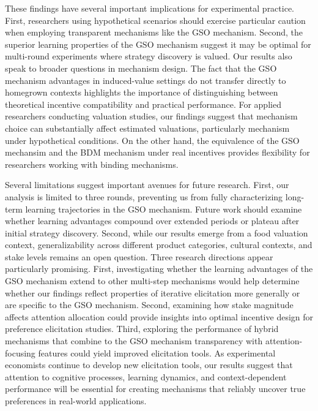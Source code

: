 \documentclass[12pt]{article}
\begin{document}
These findings have several important implications for experimental practice. First, researchers using hypothetical scenarios should exercise particular caution when employing transparent mechanisms like the GSO mechanism. Second, the superior learning properties of the GSO mechanism suggest it may be optimal for multi-round experiments where strategy discovery is valued. 
Our results also speak to broader questions in mechanism design. The fact that the GSO mechanism advantages in induced-value settings do not transfer directly to  homegrown contexts highlights the importance of distinguishing between theoretical incentive compatibility and practical performance. 
For applied researchers conducting valuation studies, our findings suggest that mechanism choice can substantially affect estimated valuations, particularly mechanism under hypothetical conditions. On the other hand, the equivalence of the GSO mechansim and the BDM mechanism under real incentives provides flexibility for researchers working with binding mechanisms.


Several limitations suggest important avenues for future research. First, our analysis is limited to three rounds, preventing us from fully characterizing long-term learning trajectories in the GSO mechanism. Future work should examine whether learning advantages compound over extended periods or plateau after initial strategy discovery. Second, while our results emerge from a food valuation context, generalizability across different product categories, cultural contexts, and stake levels remains an open question.
Three research directions appear particularly promising. First, investigating whether the learning advantages of the GSO mechanism extend to other multi-step mechanisms would help determine whether our findings reflect properties of iterative elicitation more generally or are specific to the GSO mechanism. Second, examining how stake magnitude affects attention allocation could provide insights into optimal incentive design for preference elicitation studies. Third, exploring the performance of hybrid mechanisms that combine to the GSO mechanism transparency with attention-focusing features could yield improved elicitation tools.
 As experimental economists continue to develop new elicitation tools, our results suggest that attention to cognitive processes, learning dynamics, and context-dependent performance will be essential for creating mechanisms that reliably uncover true preferences in real-world applications.
\end{document}
